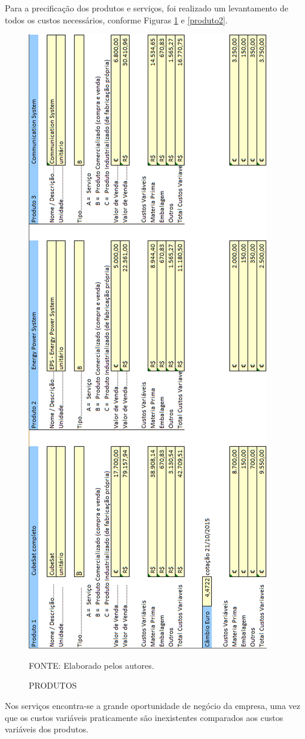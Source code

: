 \documentclass[
	12pt,				%
	openright,			%
	oneside,			%
	a4paper,			%
	english,			%
	french,				%
	spanish,			%
	brazil				%
	]{abntex2}
\begin{document}
	Para a precificação dos produtos e serviços, foi realizado um levantamento de todos os custos necessários, conforme Figuras \ref{produto1} e \ref{produto2}.

	\begin{figure}[th]
		\caption{PRODUTOS}
		\label{produto1}
		\centering
		\includegraphics[width=0.45\linewidth]{./figs/produto1}
		
		\begin{small}
			FONTE: Elaborado pelos autores.
		\end{small}
	\end{figure}
	\pagebreak
	
	Nos serviços encontra-se a grande oportunidade de negócio da empresa, uma vez que os custos variáveis praticamente são inexistentes comparados aos custos variáveis dos produtos.
	
\end{document}
